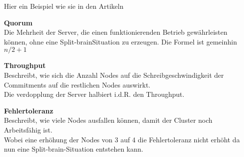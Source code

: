 Hier ein Beispiel wie sie in den Artikeln \cite{UMIGLCCI, YDS7DTYM, V4XLXN7W}
\begin{description}
    \item \textbf{Quorum}\hfill \\Die Mehrheit der Server, die einen funktionierenden Betrieb gewährleisten können, ohne eine \Gls{Split-brain}Situation zu erzeugen.
    Die Formel ist gemeinhin \(n/2 + 1\)
    \item \textbf{Throughput}\hfill \\Beschreibt, wie sich die Anzahl Nodes auf die Schreibgeschwindigkeit der Commitments auf die restlichen Nodes auswirkt.\\Die verdopplung der Server halbiert i.d.R. den Throughput.
    \item \textbf{Fehlertoleranz}\hfill \\Beschreibt, wie viele Nodes ausfallen können, damit der Cluster noch Arbeitsfähig ist.\\Wobei eine erhöhung der Nodes von 3 auf 4 die Fehlertoleranz nicht erhöht da nun eine \Gls{Split-brain}-Situation entstehen kann.
\end{description}
